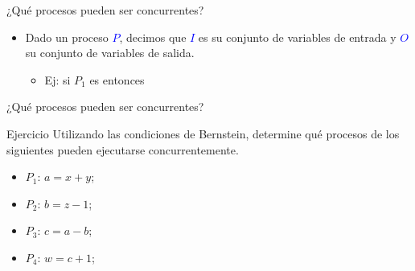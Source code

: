 \documentclass[handout]{beamer} %
\newcommand{\blue}[1]{\textcolor{blue}{#1}}
\newcommand{\redb}[1]{{\color{red!70!black}{#1}}}
\begin{document}
\begin{frame}{¿Qué procesos pueden ser concurrentes?}
  \begin{itemize}
      \item<1-> Dado un proceso \blue{$P$}, decimos que \blue{$I$} es su conjunto de variables de entrada y \blue{$O$} su conjunto de variables de salida.
      \begin{itemize}
          \item Ej: si $P_1$ es \redb{$a=x+y$;} entonces \uncover<2>{$I_1=\redb{\{x,y\}}$ y $O_1=\redb{\{a\}}$.}
      \end{itemize}
  \end{itemize}
\end{frame}

\begin{frame}{¿Qué procesos pueden ser concurrentes?}
  \begin{block}{Ejercicio}
    Utilizando las condiciones de Bernstein, determine qué procesos de los siguientes pueden ejecutarse concurrentemente.
    \begin{itemize}
        \item $P_1$: $a=x+y$;
        \item $P_2$: $b=z-1$;
        \item $P_3$: $c=a-b$;
        \item $P_4$: $w=c+1$;
    \end{itemize}
  \end{block}
\end{frame}
\end{document}
